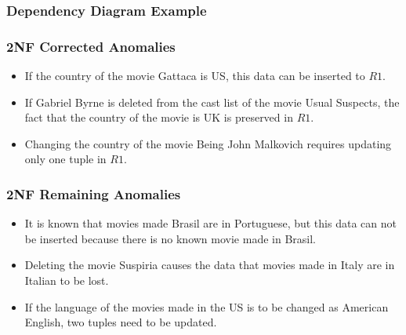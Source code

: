 \documentclass[dvipsnames]{beamer}
\begin{document}
\begin{frame}
  \frametitle{Dependency Diagram Example}

  \begin{example}
    \begin{center}
    \end{center}
  \end{example}
\end{frame}

\begin{frame}
  \frametitle{2NF Corrected Anomalies}

  \begin{example}
    \begin{itemize}
      \item If the country of the movie Gattaca is US, this data can be inserted
        to $R1$.

      \pause
      \item If Gabriel Byrne is deleted from the cast list of the movie Usual
        Suspects, the fact that the country of the movie is UK is preserved in
        $R1$.

      \pause
      \item Changing the country of the movie Being John Malkovich requires
        updating only one tuple in $R1$.
    \end{itemize}
  \end{example}
\end{frame}

\begin{frame}
  \frametitle{2NF Remaining Anomalies}

  \begin{example}
    \begin{itemize}
      \item It is known that movies made Brasil are in Portuguese, but this data
        can not be inserted because there is no known movie made in Brasil.

      \pause
      \item Deleting the movie Suspiria causes the data that movies made in
        Italy are in Italian to be lost.

      \pause
      \item If the language of the movies made in the US is to be changed as
        American English, two tuples need to be updated.
    \end{itemize}
  \end{example}
\end{frame}
\end{document}
